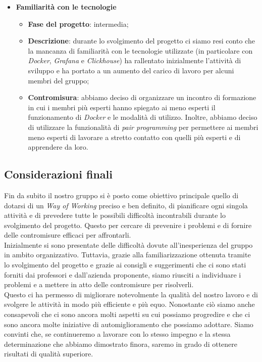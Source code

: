 \begin{itemize}
\begin{itemize}
    \end{itemize}
    \item \textbf{Familiarità con le tecnologie}
    \begin{itemize}
        \item \textbf{Fase del progetto}: intermedia;
        \item \textbf{Descrizione}: durante lo svolgimento del progetto ci siamo resi conto che la mancanza di familiarità con le tecnologie utilizzate (in particolare con \textit{Docker}, \textit{Grafana} e \textit{Clickhouse}) ha rallentato inizialmente l'attività di sviluppo e ha portato a un aumento del carico di lavoro per alcuni membri del gruppo;
        \item \textbf{Contromisura}: abbiamo deciso di organizzare un incontro di formazione in cui i membri più esperti hanno spiegato ai meno esperti il funzionamento di \textit{Docker} e le modalità di utilizzo. Inoltre, abbiamo deciso di utilizzare la funzionalità di \textit{pair programming} per permettere ai membri meno esperti di lavorare a stretto contatto con quelli più esperti e di apprendere da loro. 
    \end{itemize}
\end{itemize}

\subsection{Considerazioni finali}
Fin da subito il nostro gruppo si è posto come obiettivo principale quello di dotarsi di un \textit{Way of Working} preciso e ben definito, di pianificare ogni singola attività e di prevedere tutte le possibili difficoltà incontrabili durante lo svolgimento del progetto. Questo per cercare di prevenire i problemi e di fornire delle contromisure efficaci per affrontarli. \\
Inizialmente si sono presentate delle difficoltà dovute all'inesperienza del gruppo in ambito organizzativo. Tuttavia, grazie alla familiarizzazione ottenuta tramite lo svolgimento del progetto e grazie ai consigli e suggerimenti che ci sono stati forniti dai professori e dall'azienda proponente, siamo riusciti a individuare i problemi e a mettere in atto delle contromisure per risolverli. \\
Questo ci ha permesso di migliorare notevolmente la qualità del nostro lavoro e di svolgere le attività in modo più efficiente e più equo. Nonostante ciò siamo anche consapevoli che ci sono ancora molti aspetti su cui possiamo progredire e che ci sono ancora molte iniziative di automiglioramento che possiamo adottare. Siamo convinti che, se continueremo a lavorare con lo stesso impegno e la stessa determinazione che abbiamo dimostrato finora, saremo in grado di ottenere risultati di qualità superiore.